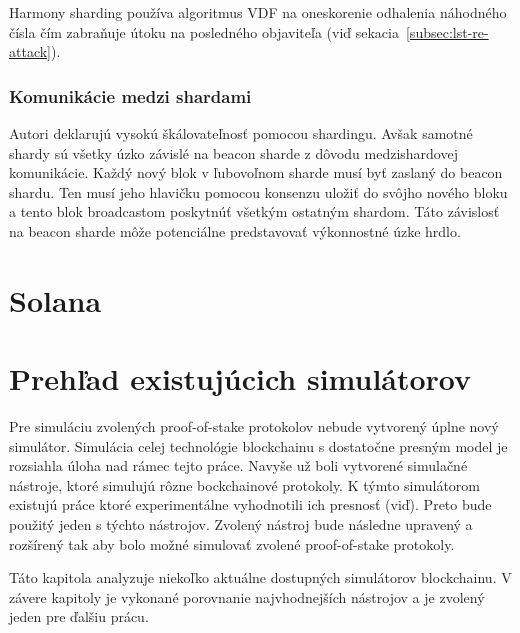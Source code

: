 Harmony sharding používa algoritmus VDF na oneskorenie odhalenia náhodného čísla čím zabraňuje útoku na posledného objaviteľa (viď sekacia~\ref{subsec:lst-re-attack}).

\subsection{Komunikácie medzi shardami}
Autori deklarujú vysokú škálovateľnosť pomocou shardingu. Avšak samotné shardy sú všetky úzko závislé na beacon sharde z dôvodu medzishardovej komunikácie. Každý nový blok v ľubovoľnom sharde musí byť zaslaný do beacon shardu. Ten musí jeho hlavičku pomocou konsenzu uložiť do svôjho nového bloku a tento blok broadcastom poskytnúť všetkým ostatným shardom. Táto závislosť na beacon sharde môže potenciálne predstavovať výkonnostné úzke hrdlo.

\chapter{Solana}

\chapter{Prehľad existujúcich simulátorov}

Pre simuláciu zvolených proof-of-stake protokolov nebude vytvorený úplne nový simulátor. Simulácia celej technológie blockchainu s dostatočne presným model je rozsiahla úloha nad rámec tejto práce. Navyše už boli vytvorené simulačné nástroje, ktoré simulujú rôzne bockchainové protokoly. K týmto simulátorom existujú práce ktoré experimentálne vyhodnotili ich presnosť (viď\cite{simulatorCompar, fanPerfEval}). Preto bude použitý jeden s týchto nástrojov. Zvolený nástroj bude následne upravený a rozšírený tak aby bolo možné simulovať zvolené proof-of-stake protokoly. 

Táto kapitola analyzuje niekoľko aktuálne dostupných simulátorov blockchainu. V závere kapitoly je vykonané porovnanie najvhodnejších nástrojov a je zvolený jeden pre ďalšiu prácu.


